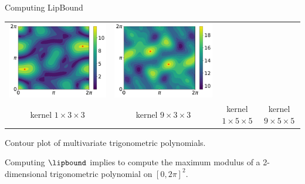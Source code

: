 \begin{frame}{Computing LipBound}
\begin{minipage}{\textwidth}
\begin{tabular}{cccc}
      \includegraphics[scale=0.15]{images/contour_poly_200_1_1_5.pdf} & 
      \includegraphics[scale=0.15]{images/contour_poly_200_1_9_5.pdf} \\
      \footnotesize{kernel $1\times3\times3$} &
      \footnotesize{kernel $9\times3\times3$} &
      \footnotesize{kernel $1\times5\times5$} &
      \footnotesize{kernel $9\times5\times5$}
    \end{tabular}

    \vspace{0.2cm}
    \footnotesize{Contour plot of multivariate trigonometric polynomials.}
  \end{minipage}

  \vspace{0.3cm}
  Computing $\lipbound$ implies to compute the maximum modulus of a 2-dimensional trigonometric polynomial on 
  $[ 0, 2\pi]^2$.


\end{frame}
